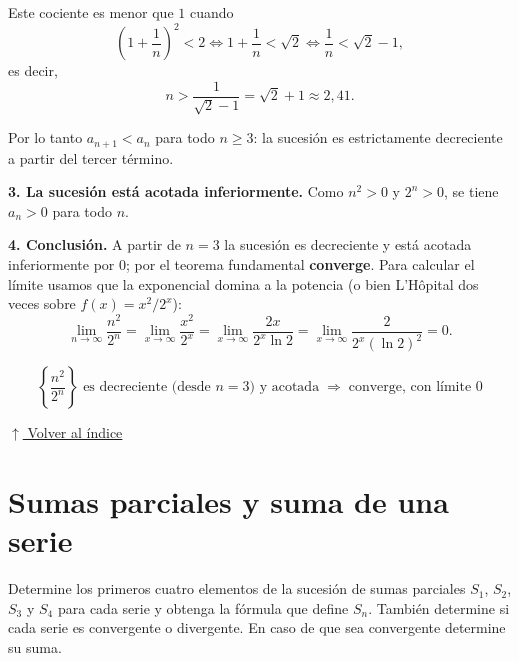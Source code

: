 \documentclass[12pt]{article}
\newcommand{\volverindice}{%
    \vspace{1em}%
    \begin{flushright}%
        \hyperlink{indice}{\small $\uparrow$ Volver al índice}%
    \end{flushright}%
}
\begin{document}
\begin{enumerate}[label=\alph*.-]
    Este cociente es menor que $1$ cuando
    \[
    \left(1+\frac1n\right)^{2}<2
    \iff
    1+\frac1n<\sqrt2
    \iff
    \frac1n<\sqrt2-1 ,
    \]
    es decir,
    \[
    n>\frac{1}{\sqrt2-1}=\sqrt2+1\approx 2{,}41 .
    \]

    Por lo tanto $a_{n+1}<a_n$ para todo $n\ge 3$: la sucesión es estrictamente
    decreciente a partir del tercer término.

    \textbf{3. La sucesión está acotada inferiormente.} Como $n^{2}>0$ y
    $2^{n}>0$, se tiene $a_n>0$ para todo $n$.

    \textbf{4. Conclusión.} A partir de $n=3$ la sucesión es decreciente y está
    acotada inferiormente por $0$; por el teorema fundamental \textbf{converge}.
    Para calcular el límite usamos que la exponencial domina a la potencia
    (o bien L'Hôpital dos veces sobre $f(x)=x^{2}/2^{x}$):
    \[
    \lim_{n\to\infty}\frac{n^{2}}{2^{n}}
    =\lim_{x\to\infty}\frac{x^{2}}{2^{x}}
    =\lim_{x\to\infty}\frac{2x}{2^{x}\ln 2}
    =\lim_{x\to\infty}\frac{2}{2^{x}(\ln 2)^{2}}
    =0 .
    \]

    \[
    \boxed{
    \left\{\frac{n^{2}}{2^{n}}\right\}
    \text{ es decreciente (desde }n=3\text{) y acotada}
    \;\Rightarrow\;\text{converge, con límite }0
    }
    \]

\end{enumerate}

\volverindice
\newpage


\section{Sumas parciales y suma de una serie}

Determine los primeros cuatro elementos de la sucesión de sumas parciales
$S_1$, $S_2$, $S_3$ y $S_4$ para cada serie y obtenga la fórmula que define
$S_n$. También determine si cada serie es convergente o divergente. En caso de
que sea convergente determine su suma.
\end{document}
